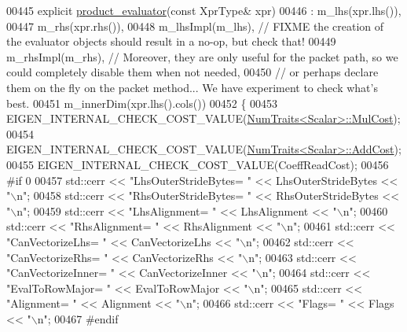 \begin{DoxyCode}
00445   \textcolor{keyword}{explicit} \hyperlink{struct_eigen_1_1internal_1_1product__evaluator}{product\_evaluator}(\textcolor{keyword}{const} XprType& xpr)
00446     : m\_lhs(xpr.lhs()),
00447       m\_rhs(xpr.rhs()),
00448       m\_lhsImpl(m\_lhs),     \textcolor{comment}{// FIXME the creation of the evaluator objects should result in a no-op, but
       check that!}
00449       m\_rhsImpl(m\_rhs),     \textcolor{comment}{//       Moreover, they are only useful for the packet path, so we could
       completely disable them when not needed,}
00450                             \textcolor{comment}{//       or perhaps declare them on the fly on the packet method... We have
       experiment to check what's best.}
00451       m\_innerDim(xpr.lhs().cols())
00452   \{
00453     EIGEN\_INTERNAL\_CHECK\_COST\_VALUE(\hyperlink{group___core___module_struct_eigen_1_1_num_traits}{NumTraits<Scalar>::MulCost});
00454     EIGEN\_INTERNAL\_CHECK\_COST\_VALUE(\hyperlink{group___core___module_struct_eigen_1_1_num_traits}{NumTraits<Scalar>::AddCost});
00455     EIGEN\_INTERNAL\_CHECK\_COST\_VALUE(CoeffReadCost);
00456 \textcolor{preprocessor}{#if 0}
00457     std::cerr << \textcolor{stringliteral}{"LhsOuterStrideBytes=  "} << LhsOuterStrideBytes << \textcolor{stringliteral}{"\(\backslash\)n"};
00458     std::cerr << \textcolor{stringliteral}{"RhsOuterStrideBytes=  "} << RhsOuterStrideBytes << \textcolor{stringliteral}{"\(\backslash\)n"};
00459     std::cerr << \textcolor{stringliteral}{"LhsAlignment=         "} << LhsAlignment << \textcolor{stringliteral}{"\(\backslash\)n"};
00460     std::cerr << \textcolor{stringliteral}{"RhsAlignment=         "} << RhsAlignment << \textcolor{stringliteral}{"\(\backslash\)n"};
00461     std::cerr << \textcolor{stringliteral}{"CanVectorizeLhs=      "} << CanVectorizeLhs << \textcolor{stringliteral}{"\(\backslash\)n"};
00462     std::cerr << \textcolor{stringliteral}{"CanVectorizeRhs=      "} << CanVectorizeRhs << \textcolor{stringliteral}{"\(\backslash\)n"};
00463     std::cerr << \textcolor{stringliteral}{"CanVectorizeInner=    "} << CanVectorizeInner << \textcolor{stringliteral}{"\(\backslash\)n"};
00464     std::cerr << \textcolor{stringliteral}{"EvalToRowMajor=       "} << EvalToRowMajor << \textcolor{stringliteral}{"\(\backslash\)n"};
00465     std::cerr << \textcolor{stringliteral}{"Alignment=            "} << Alignment << \textcolor{stringliteral}{"\(\backslash\)n"};
00466     std::cerr << \textcolor{stringliteral}{"Flags=                "} << Flags << \textcolor{stringliteral}{"\(\backslash\)n"};
00467 \textcolor{preprocessor}{#endif}

\end{DoxyCode}
